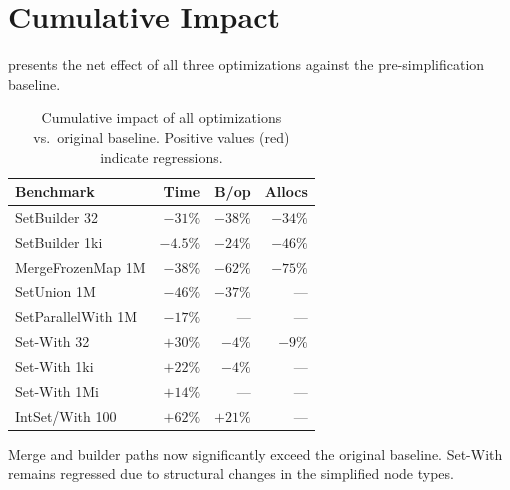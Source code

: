 \documentclass[11pt,twocolumn]{article}
\newcommand{\improve}[1]{\textcolor{positive}{\textbf{#1}}}
\newcommand{\regress}[1]{\textcolor{negative}{\textbf{#1}}}
\begin{document}
\section{Cumulative Impact}
\label{sec:cumulative}

 presents the net effect of all three optimizations
against the pre-simplification baseline.

\begin{table}[h]
\centering
\caption{Cumulative impact of all optimizations vs.\ original baseline.
  Positive values (red) indicate regressions.}
\label{tab:cumulative}
\begin{tabular}{@{}lrrr@{}}
\toprule
Benchmark & Time & B/op & Allocs \\
\midrule
SetBuilder 32   & \improve{$-31\%$} & $-38\%$ & $-34\%$ \\
SetBuilder 1ki  & \improve{$-4.5\%$} & $-24\%$ & $-46\%$ \\
MergeFrozenMap 1M & \improve{$-38\%$} & $-62\%$ & $-75\%$ \\
SetUnion 1M     & \improve{$-46\%$} & $-37\%$ & --- \\
SetParallelWith 1M & \improve{$-17\%$} & --- & --- \\
\midrule
Set-With 32     & \regress{$+30\%$} & $-4\%$ & $-9\%$ \\
Set-With 1ki    & \regress{$+22\%$} & $-4\%$ & --- \\
Set-With 1Mi    & \regress{$+14\%$} & --- & --- \\
IntSet/With 100 & \regress{$+62\%$} & $+21\%$ & --- \\
\bottomrule
\end{tabular}
\end{table}

Merge and builder paths now significantly exceed the original baseline.
Set-With remains regressed due to structural changes in the simplified node
types.
\end{document}
